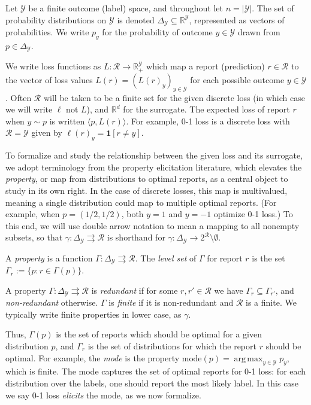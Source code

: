 \documentclass[anon,12pt]{colt2019}
\newcommand{\reals}{\mathbb{R}}
\newcommand{\mode}{\mathrm{mode}}
\newcommand{\simplex}{\Delta_\Y}
\newcommand{\R}{\mathcal{R}}
\newcommand{\Y}{\mathcal{Y}}
\newcommand{\inprod}[2]{\langle #1, #2 \rangle}%
\newcommand{\toto}{\rightrightarrows}
\newcommand{\Ind}{\mathbf{1}}
\DeclareMathOperator*{\argmax}{arg\,max}
\begin{document}
Let $\Y$ be a finite outcome (label) space, and throughout let $n=|\Y|$.
The set of probability distributions on $\Y$ is denoted $\simplex\subseteq\reals^{\Y}$, represented as vectors of probabilities.
We write $p_y$ for the probability of outcome $y \in \Y$ drawn from $p \in \simplex$.

We write loss functions as $L:\R\to\reals^\Y_+$ which map a report (prediction) $r\in\R$ to the vector of loss values $L(r) = (L(r)_y)_{y\in\Y}$ for each possible outcome $y\in\Y$.
Often $\R$ will be taken to be a finite set for the given discrete loss (in which case we will write $\ell$ not $L$), and $\reals^d$ for the surrogate.
The expected loss of report $r$ when $y \sim p$ is written $\inprod{p}{L(r)}$.
For example, 0-1 loss is a discrete loss with $\R = \Y$ given by $\ell(r)_y = \Ind[r \neq y]$.

To formalize and study the relationship between the given loss and its surrogate, we adopt terminology from the property elicitation literature, which elevates the \emph{property}, or map from distributions to optimal reports, as a central object to study in its own right.
In the case of discrete losses, this map is multivalued, meaning a single distribution could map to multiple optimal reports.
(For example, when $p=(1/2,1/2)$, both $y=1$ and $y=-1$ optimize 0-1 loss.)
To this end, we will use double arrow notation to mean a mapping to all nonempty subsets, so that $\gamma: \simplex \toto \R$ is shorthand for $\gamma: \simplex \to 2^{\R} \setminus \emptyset$.

\begin{definition}\label{def:property}
  A \emph{property} is a function $\Gamma:\simplex\toto\R$.
  The \emph{level set} of $\Gamma$ for report $r$ is the set $\Gamma_r := \{p : r \in \Gamma(p)\}$.
\end{definition}

\begin{definition}
  A property $\Gamma:\simplex\toto\R$ is \emph{redundant} if for some $r,r'\in\R$ we have $\Gamma_r \subseteq \Gamma_{r'}$, and \emph{non-redundant} otherwise.
  $\Gamma$ is \emph{finite} if it is non-redundant and $\R$ is a finite.
  We typically write finite properties in lower case, as $\gamma$.
\end{definition}

Thus, $\Gamma(p)$ is the set of reports which should be optimal for a given distribution $p$, and $\Gamma_r$ is the set of distributions for which the report $r$ should be optimal.
For example, the \emph{mode} is the property $\mode(p) = \argmax_{y\in\Y} p_y$, which is finite.
The mode captures the set of optimal reports for 0-1 loss: for each distribution over the labels, one should report the most likely label.
In this case we say 0-1 loss \emph{elicits} the mode, as we now formalize.
\end{document}
